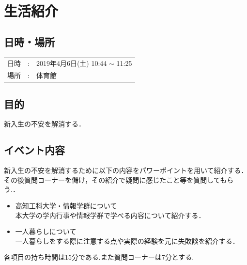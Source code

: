 \documentclass[a4j,titlepage]{jarticle}
\begin{document}
\section{生活紹介}

\subsection{日時・場所}

\begin{tabular}{p{}rp{}}
  日時 & : & 2019年4月6日(土) 10:44 $\sim$ 11:25 \\ %
  場所 & : & 体育館
\end{tabular}

\subsection{目的}
新入生の不安を解消する．

\subsection{イベント内容}
新入生の不安を解消するために以下の内容をパワーポイントを用いて紹介する．その後質問コーナーを儲け，その紹介で疑問に感じたこと等を質問してもらう.．

\begin{itemize}
\item 高知工科大学・情報学群について \\
  本大学の学内行事や情報学群で学べる内容について紹介する．
\item 一人暮らしについて \\
  一人暮らしをする際に注意する点や実際の経験を元に失敗談を紹介する．
\end{itemize}

各項目の持ち時間は15分である.また質問コーナーは7分とする.
\end{document}
